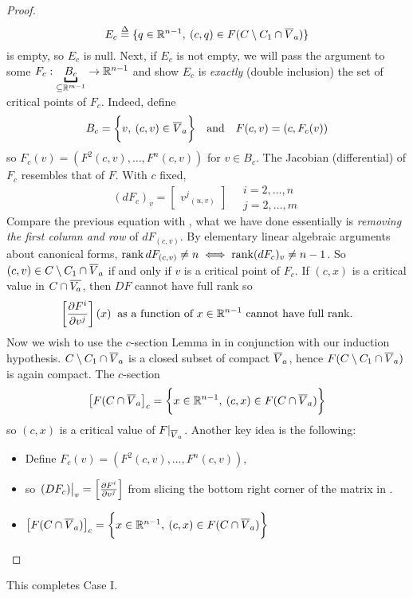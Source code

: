 \documentclass[../main-manifolds.tex]{subfiles}
\begin{document}
\begin{proof}
    \[
    E_c \overset{\Delta}{=} \{q\in \mathbb{R}^{n-1},\: (c,q)\in F(C\setminus C_1\cap \overline{V}_a)\}
    \]
    is empty, so $E_c$ is null. Next, if $E_c$ is not empty, we will pass the argument to some $F_c: \underbracket{B_c}_{\subseteq \real^{m-1}}\to \real^{n-1}$ and show $E_c$ is \emph{exactly} (double inclusion) the set of critical points of $F_c$. Indeed, define
    \[
        B_c = \bigset{v,\: (c,v)\in\cl{V}_a}\qqtext{and}F(c,v)=(c,F_c(v))
    \]
    so $F_c(v) = (F^2(c,v),\ldots,F^{n}(c,v))$ for $v\in B_c$. The Jacobian (differential) of $F_c$ resembles that of $F$. With $c$ fixed,
    \[
        (dF_c)_v = \begin{bmatrix}
            {v^j}_{(u,v)}
        \end{bmatrix}\quad \substack{i=2,\ldots,n\\ j=2,\ldots,m}
    \]
    Compare the previous equation with , what we have done essentially is \emph{removing the first column and row} of $dF_{(c,v)}$. By elementary linear algebraic arguments about canonical forms, $\operatorname{rank} dF_{(c,v)}\neq n\iff \operatorname{rank} (dF_c)_v\neq n-1$. So $(c,v)\in C\setminus C_1\cap \overline{V}_a$ if and only if $v$ is a critical point of $F_c$.  If $(c,x)$ is a critical value in $C\cap \overline{V_a}$, then $DF$ cannot have full rank so 
    \[
        \qty[\pdv{F^i}{v^j}](x)\:\text{ as a function of }x\in\mathbb{R}^{n-1}\text{ cannot have full rank.}
    \]
    Now we wish to use the $c$-section Lemma in  in conjunction with our induction hypothesis. $C\setminus C_1\cap \overline{V}_a$ is a closed subset of compact $\overline{V}_a$, hence $F(C\setminus C_1\cap \overline{V}_a)$ is again compact. The $c$-section
    \[
        \qty[F(C\cap \overline{V}_a]_c = \biggl\{{x\in\mathbb{R}^{n-1},\: (c,x)\in F(C\cap\overline{V}_a)}\biggr\}
    \]
    so $(c,x)$ is a critical value of $F|_{\overline{V}_a}$. Another key idea is the following:
    \begin{itemize}
        \item Define $F_c(v) = (F^2(c,v),\ldots, F^n(c,v))$, 
        \item so $\eval{(DF_c)}_{v} = \qty[\pdv{F^i}{v^j}]$ from slicing the bottom right corner of the matrix in .
        \item $\qty[F(C\cap \overline{V}_a)]_c = \biggl\{{x\in\mathbb{R}^{n-1},\: (c,x)\in F(C\cap \overline{V}_a)}\biggr\}$ 
    \end{itemize}
    
\end{proof}
This completes Case I. 






\end{document}
